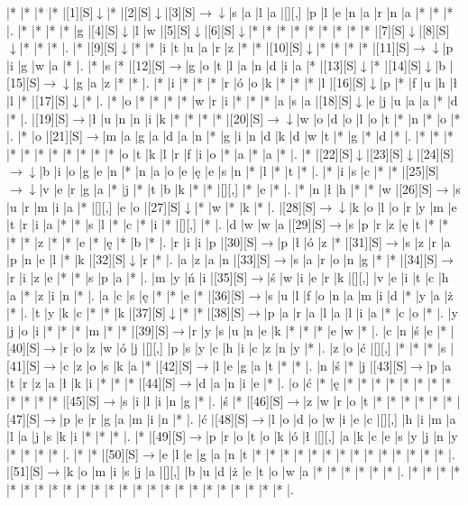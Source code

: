 \documentclass[11pt]{article}
\newcommand\drarr{$\rightarrow \!\!\!\!\! \downarrow$}
\newcommand\rarr{$\rightarrow$}
\newcommand\darr{$\downarrow$}
\begin{document}
\noindent\begin{Puzzle}{23}{29}|*	|*	|*	|*	|[1][S]\darr	|*	|[2][S]\darr	|[3][S]\drarr	|s	|a	|l	|a	|[][,]{ }	|p	|l	|e	|n	|a	|r	|n	|a	|*	|*	|*	|.
|*	|*	|*	|*	|g	|[4][S]\darr	|l	|w	|[5][S]\darr	|[6][S]\darr	|*	|*	|*	|*	|*	|*	|*	|*	|*	|[7][S]\darr	|[8][S]\darr	|*	|*	|*	|.
|*	|[9][S]\darr	|*	|*	|i	|t	|u	|a	|r	|z	|*	|*	|[10][S]\darr	|*	|*	|*	|*	|[11][S]\drarr	|p	|i	|g	|w	|a	|*	|.
|*	|s	|*	|[12][S]\rarr	|g	|o	|t	|l	|a	|n	|d	|i	|a	|*	|[13][S]\darr	|*	|[14][S]\darr	|b	|[15][S]\drarr	|g	|a	|z	|*	|*	|.
|*	|i	|*	|*	|*	|r	|ó	|o	|k	|*	|*	|*	|l	|[16][S]\darr	|p	|*	|f	|u	|h	|ł	|l	|*	|[17][S]\darr	|*	|.
|*	|o	|*	|*	|*	|*	|w	|r	|i	|*	|*	|*	|a	|s	|a	|[18][S]\darr	|e	|j	|u	|a	|a	|*	|d	|*	|.
|[19][S]\rarr	|ł	|u	|n	|n	|i	|k	|*	|*	|*	|*	|[20][S]\drarr	|w	|o	|d	|o	|l	|o	|t	|*	|n	|*	|o	|*	|.
|*	|o	|[21][S]\rarr	|m	|a	|g	|a	|d	|a	|n	|*	|g	|i	|n	|d	|k	|d	|w	|t	|*	|g	|*	|d	|*	|.
|*	|*	|*	|*	|*	|*	|*	|*	|*	|*	|*	|o	|t	|k	|l	|r	|f	|i	|o	|*	|a	|*	|a	|*	|.
|*	|[22][S]\darr	|[23][S]\darr	|[24][S]\drarr	|b	|i	|o	|g	|e	|n	|*	|n	|a	|o	|e	|ę	|e	|s	|n	|*	|l	|*	|t	|*	|.
|*	|i	|s	|c	|*	|*	|[25][S]\drarr	|v	|e	|r	|g	|a	|*	|j	|*	|t	|b	|k	|*	|*	|[][,]{ }	|*	|e	|*	|.
|*	|n	|ł	|h	|*	|*	|w	|[26][S]\rarr	|s	|u	|r	|m	|i	|a	|*	|[][,]{ }	|e	|o	|[27][S]\darr	|*	|w	|*	|k	|*	|.
|[28][S]\drarr	|k	|o	|l	|o	|r	|y	|m	|e	|t	|r	|i	|a	|*	|*	|s	|l	|*	|c	|*	|i	|*	|[][,]{ }	|*	|.
|d	|w	|w	|a	|[29][S]\rarr	|s	|p	|r	|z	|ę	|t	|*	|*	|*	|*	|z	|*	|*	|e	|*	|ę	|*	|b	|*	|.
|r	|i	|i	|p	|[30][S]\rarr	|p	|ł	|ó	|z	|*	|[31][S]\rarr	|s	|z	|r	|a	|p	|n	|e	|l	|*	|k	|[32][S]\darr	|r	|*	|.
|a	|z	|a	|n	|[33][S]\rarr	|s	|a	|r	|o	|n	|g	|*	|*	|[34][S]\rarr	|r	|i	|z	|e	|*	|*	|s	|p	|a	|*	|.
|m	|y	|ń	|i	|[35][S]\rarr	|ś	|w	|i	|e	|r	|k	|[][,]{ }	|v	|e	|i	|t	|c	|h	|a	|*	|z	|i	|n	|*	|.
|a	|c	|s	|ę	|*	|*	|e	|*	|[36][S]\rarr	|s	|u	|l	|f	|o	|n	|a	|m	|i	|d	|*	|y	|a	|ż	|*	|.
|t	|y	|k	|c	|*	|*	|k	|[37][S]\darr	|*	|*	|[38][S]\rarr	|p	|a	|r	|a	|l	|a	|l	|i	|a	|*	|c	|o	|*	|.
|y	|j	|o	|i	|*	|*	|*	|m	|*	|*	|[39][S]\rarr	|r	|y	|s	|u	|n	|e	|k	|*	|*	|*	|e	|w	|*	|.
|c	|n	|ś	|e	|*	|[40][S]\rarr	|r	|o	|z	|w	|ó	|j	|[][,]{ }	|p	|s	|y	|c	|h	|i	|c	|z	|n	|y	|*	|.
|z	|o	|ć	|[][,]{ }	|*	|*	|*	|s	|[41][S]\rarr	|c	|z	|o	|s	|k	|a	|*	|[42][S]\rarr	|l	|e	|g	|a	|t	|*	|*	|.
|n	|ś	|*	|j	|[43][S]\rarr	|p	|a	|t	|r	|z	|a	|ł	|k	|i	|*	|*	|*	|[44][S]\rarr	|d	|a	|n	|i	|e	|*	|.
|o	|ć	|*	|ę	|*	|*	|*	|*	|*	|*	|*	|*	|*	|*	|*	|*	|[45][S]\rarr	|s	|i	|l	|i	|n	|g	|*	|.
|ś	|*	|[46][S]\rarr	|z	|w	|r	|o	|t	|*	|*	|*	|*	|*	|*	|[47][S]\rarr	|p	|e	|r	|g	|a	|m	|i	|n	|*	|.
|ć	|[48][S]\rarr	|l	|o	|d	|o	|w	|i	|e	|c	|[][,]{ }	|h	|i	|m	|a	|l	|a	|j	|s	|k	|i	|*	|*	|*	|.
|*	|[49][S]\rarr	|p	|r	|o	|t	|o	|k	|ó	|ł	|[][,]{ }	|a	|k	|c	|e	|s	|y	|j	|n	|y	|*	|*	|*	|*	|.
|*	|*	|[50][S]\rarr	|e	|l	|e	|g	|a	|n	|t	|*	|*	|*	|*	|*	|*	|*	|*	|*	|*	|*	|*	|*	|*	|.
|[51][S]\rarr	|k	|o	|m	|i	|s	|j	|a	|[][,]{ }	|b	|u	|d	|ż	|e	|t	|o	|w	|a	|*	|*	|*	|*	|*	|*	|.
|*	|*	|*	|*	|*	|*	|*	|*	|*	|*	|*	|*	|*	|*	|*	|*	|*	|*	|*	|*	|*	|*	|*	|*	|.\end{Puzzle}
\end{document}
